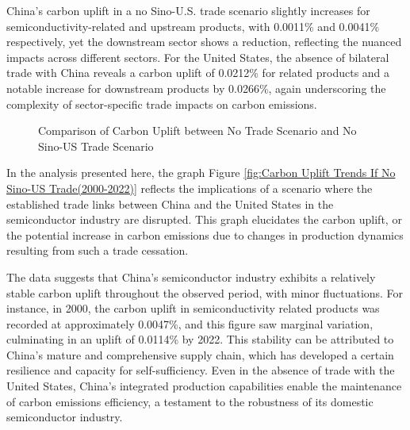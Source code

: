 China's carbon uplift in a no Sino-U.S. trade scenario slightly increases for semiconductivity-related and upstream products, with 0.0011\% and 0.0041\% respectively, yet the downstream sector shows a reduction, reflecting the nuanced impacts across different sectors. For the United States, the absence of bilateral trade with China reveals a carbon uplift of 0.0212\% for related products and a notable increase for downstream products by 0.0266\%, again underscoring the complexity of sector-specific trade impacts on carbon emissions.
\ifincludefigures 
\begin{figure}
 \centering
 \caption{Comparison of Carbon Uplift between No Trade Scenario and No Sino-US Trade Scenario}\label{fig:Comparison of Carbon Uplift between No Trade Scenario and No Sino-US Trade Scenario}
\end{figure}
\fi
In the analysis presented here, the graph Figure \ref{fig:Carbon Uplift Trends If No Sino-US Trade(2000-2022)} reflects the implications of a scenario where the established trade links between China and the United States in the semiconductor industry are disrupted. This graph elucidates the carbon uplift, or the potential increase in carbon emissions due to changes in production dynamics resulting from such a trade cessation.

The data suggests that China's semiconductor industry exhibits a relatively stable carbon uplift throughout the observed period, with minor fluctuations. For instance, in 2000, the carbon uplift in semiconductivity related products was recorded at approximately 0.0047\%, and this figure saw marginal variation, culminating in an uplift of 0.0114\% by 2022. This stability can be attributed to China's mature and comprehensive supply chain, which has developed a certain resilience and capacity for self-sufficiency. Even in the absence of trade with the United States, China's integrated production capabilities enable the maintenance of carbon emissions efficiency, a testament to the robustness of its domestic semiconductor industry.

